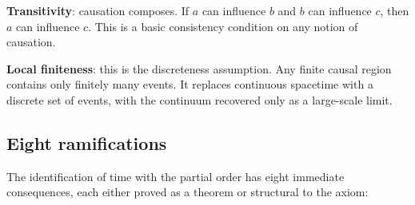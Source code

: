 \documentclass[11pt,letterpaper]{article}
\theoremstyle{remark}
\begin{document}
\textbf{Transitivity}: causation composes. If $a$ can influence $b$
and $b$ can influence $c$, then $a$ can influence $c$. This is a
basic consistency condition on any notion of causation.

\textbf{Local finiteness}: this is the discreteness assumption. Any
finite causal region contains only finitely many events. It replaces
continuous spacetime with a discrete set of events, with the
continuum recovered only as a large-scale limit.

\subsection{Eight ramifications}

The identification of time with the partial order has eight immediate
consequences, each either proved as a theorem or structural to the
axiom:
\end{document}
